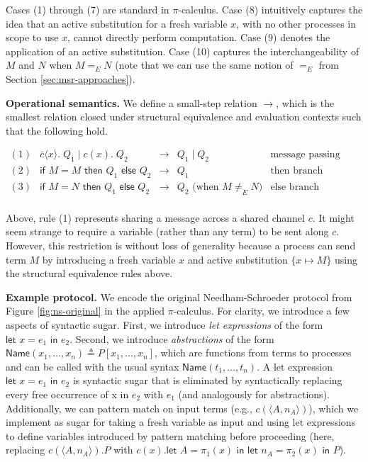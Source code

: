 \documentclass{article}
\theoremstyle{definition}
\begin{document}
Cases (1) through (7) are standard in $\pi$-calculus. Case (8) intuitively captures the idea that an active substitution for a fresh variable $x$, with no other processes in scope to use $x$, cannot directly perform computation. Case (9) denotes the application of an active substitution. Case (10) captures the interchangeability of $M$ and $N$ when $M =_E N$ (note that we can use the same notion of $=_E$ from Section \ref{sec:msr-approaches}).

\textbf{Operational semantics.} We define a small-step relation $\rightarrow$, which is the smallest relation closed under structural equivalence and evaluation contexts such that the following hold. 

$
\begin{array}{crcll}
(1)  & \bar{c}\langle x \rangle.\; Q_1 \mid c(x).\; Q_2 & \rightarrow & Q_1 \mid Q_2 & \text{message passing}\\
(2)  & \textsf{if } M = M \textsf{ then } Q_1 \textsf{ else } Q_2 & \rightarrow & Q_1  & \text{then branch}\\
(3)  & \textsf{if } M = N \textsf{ then } Q_1 \textsf{ else } Q_2 & \rightarrow & Q_2 \text{ (when } M \neq_E N \text{)}  & \text{else branch}\\
\end{array}
$

Above, rule (1) represents sharing a message across a shared channel $c$. 
It might seem strange to require a variable (rather than any term) to be sent along $c$. 
However, this restriction is without loss of generality because a process can send term $M$ 
by introducing a fresh variable $x$ and active substitution $\{x\mapsto M\}$ using the structural equivalence rules above. 

\textbf{Example protocol.} 
We encode the original Needham-Schroeder protocol from Figure \ref{fig:ns-original} 
in the applied $\pi$-calculus. 
For clarity, we introduce a few aspects of syntactic sugar. 
First, we  introduce \textit{let expressions} of the form 
$\textsf{let }x = e_1 \textsf{ in } e_2$. 
Second, we introduce \textit{abstractions} of the form $\mathsf{Name}(x_1, \dots, x_n) \triangleq P[x_1, \dots, x_n]$, 
which are functions from terms to processes and can be called with the usual syntax 
$\mathsf{Name}(t_1, \dots, t_n)$. 
A let expression $\textsf{let } x = e_1 \textsf{ in } e_2$
is syntactic sugar that is eliminated by syntactically replacing every free occurrence of x
in $e_2$ with $e_1$ (and analogously for abstractions).
Additionally, we can pattern match on input terms (e.g., $c(\langle A, n_A \rangle)$), 
which we implement as sugar for taking a fresh variable as input and using let expressions to define 
variables introduced by pattern matching before proceeding
(here, replacing $c(\langle A, n_A \rangle).P$ with 
${c}(x).\textsf{let }A = \pi_1(x) \textsf{ in } \textsf{let }n_A = \pi_2(x) \textsf{ in } P$).
\end{document}
